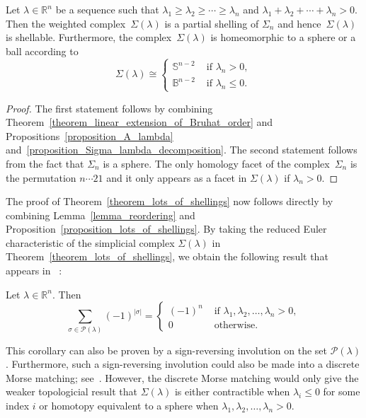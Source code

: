 \documentclass[ALCO,ThmDefs,Unicode,epreuves]{cedram}
\newcommand{\Bbbb}{\mathbb{B}}
\newcommand{\Rrr}{\mathbb{R}}
\newcommand{\Sss}{\mathbb{S}}
\newcommand{\lambdaweaklydecreasing}
{\lambda_{1} \geq \lambda_{2} \geq \cdots \geq \lambda_{n}}
\newcommand{\lambdasumpositive}
{\lambda_{1} + \lambda_{2} + \cdots + \lambda_{n} > 0}
\begin{document}
\begin{prop}
Let $\lambda \in \Rrr^{n}$ be a sequence such that
$\lambdaweaklydecreasing$ and 
$\lambdasumpositive$.
Then the weighted complex~$\Sigma(\lambda)$
is a partial shelling of $\Sigma_{n}$
and hence~$\Sigma(\lambda)$ is shellable.
Furthermore,
the complex~$\Sigma(\lambda)$ is homeomorphic to a sphere or a ball
according to
$$
\Sigma(\lambda)
\cong
\begin{cases}
\Sss^{n-2} & \text{ if } \lambda_{n} > 0, \\
\Bbbb^{n-2} & \text{ if } \lambda_{n} \leq 0.
\end{cases}
$$
\label{proposition_lots_of_shellings}
\end{prop}
\begin{proof}
The first statement follows by combining
Theorem~\ref{theorem_linear_extension_of_Bruhat_order}
and
Propositions~\ref{proposition_A_lambda}
and~\ref{proposition_Sigma_lambda_decomposition}.
The second statement follows
from the fact that $\Sigma_{n}$ is a sphere.
The only homology facet of the complex~$\Sigma_{n}$
is the permutation $n \cdots 21$
and it only appears as a facet in
$\Sigma(\lambda)$ if $\lambda_{n} > 0$.
\end{proof}



The proof of Theorem~\ref{theorem_lots_of_shellings}
now follows directly by combining
Lemma~\ref{lemma_reordering}
and
Proposition~\ref{proposition_lots_of_shellings}.
By taking the reduced Euler characteristic
of the simplicial complex $\Sigma(\lambda)$ in
Theorem~\ref{theorem_lots_of_shellings},
we obtain the following result 
that appears in~\cite[Corollary~A.3]{Morel} :


\begin{coro}
Let $\lambda \in \Rrr^{n}$.
Then
$$
   \sum_{\sigma \in \mathcal{P}(\lambda)} (-1)^{|\sigma|} =
   \begin{cases}
   (-1)^{n}   & \text{ if  } \lambda_{1}, \lambda_{2}, \ldots, \lambda_{n} > 0,  \\
   0        & \text{ otherwise. }
   \end{cases}
$$
\end{coro}

This corollary can also be proven by a sign-reversing involution
on the set $\mathcal{P}(\lambda)$. 
Furthermore, such a sign-reversing involution could
also be made into a discrete Morse matching;
see~\cite{Forman}.
However, the discrete Morse matching would only
give the weaker topologicial result that $\Sigma(\lambda)$
is either contractible when $\lambda_{i} \leq 0$
for some index $i$
or
homotopy equivalent to a sphere when
$\lambda_{1}, \lambda_{2}, \ldots, \lambda_{n} > 0$.
\end{document}
